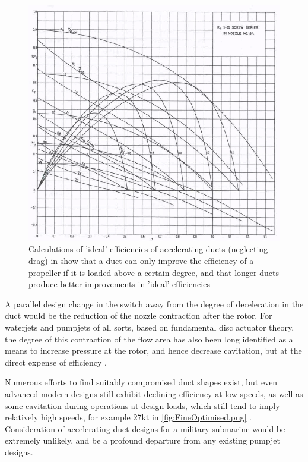 \documentclass{article}\usepackage[]{graphicx}\usepackage[]{color}
\begin{document}
\begin{figure}
\includegraphics[width=\textwidth]{DuctedEfficiency.png}
\caption{Calculations of 'ideal' efficiencies of accelerating ducts (neglecting drag) in \cite{oosterveld1970} show that a duct can only improve the efficiency of a propeller if it is loaded above a certain degree, and that longer ducts produce better improvements in 'ideal' efficiencies}
\label{fig:DuctedEfficiency.png}
\end{figure}

A parallel design change in the switch away from the degree of deceleration in the duct would be the reduction of the nozzle contraction after the rotor.  For waterjets and pumpjets of all sorts, based on fundamental disc actuator theory, the degree of this contraction of the flow area has also been long identified as a means to increase pressure at the rotor, and hence decrease cavitation, but at the direct expense of efficiency \parencite[14]{van1996waterjet}.

Numerous efforts to find suitably compromised duct shapes exist, but even advanced modern designs still exhibit declining efficiency at low speeds, as well as some cavitation during operations at design loads, which still tend to imply relatively high speeds, for example 27kt in \ref{fig:FineOptimised.png} .  Consideration of accelerating duct designs for a military submarine would be extremely unlikely, and be a profound departure from any existing pumpjet designs.
\end{document}
